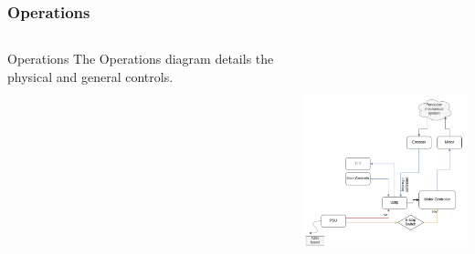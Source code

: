 \documentclass[aspectratio=169]{beamer}
\begin{document}
\begin{frame}
    \frametitle{Operations}

    \begin{columns}
        \begin{column}{0.30\textwidth}
            \begin{block}{Operations}
                The Operations diagram details the physical and general controls.
            \end{block}
        \end{column}

        \begin{column}{0.70\textwidth}
            \includegraphics[height=7cm]{Operations}
        \end{column}
    \end{columns}


\end{frame}
\end{document}
